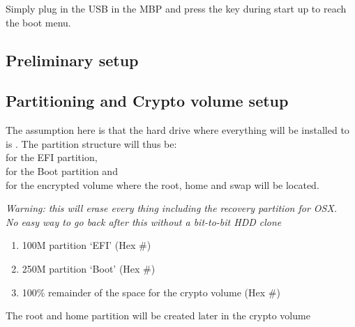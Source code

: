Simply plug in the USB in the MBP and press the  key during start up to reach the boot menu.

\subsection{Preliminary setup}


\subsection{Partitioning and Crypto volume setup}

The assumption here is that the hard drive where everything will be installed to is . The partition structure will thus be: \\
 for the EFI partition,\\
 for the Boot partition and\\
 for the encrypted volume where the root, home and swap will be located.\\

\begin{blocksection}
	\textit{Warning: this will erase every thing including the recovery partition for OSX. \\
		No easy way to go back after this without a bit-to-bit HDD clone}
	\begin{enumerate}
		\item 100M partition `EFI' (Hex \#)
		\item 250M partition `Boot' (Hex \#)
		\item 100\% remainder of the space for the crypto volume (Hex \#)
	\end{enumerate}
	The root and home partition will be created later in the crypto volume
\end{blocksection}

